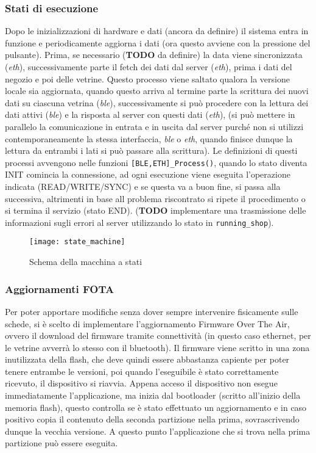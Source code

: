 \subsubsection{Stati di esecuzione}


Dopo le inizializzazioni di hardware e dati (ancora da definire) il sistema entra in funzione e periodicamente aggiorna i dati (ora questo avviene con la pressione del pulsante). Prima, se necessario (\textbf{TODO} da definire) la data viene sincronizzata (\textit{eth}), successivamente parte il fetch dei dati dal server (\textit{eth}), prima i dati del negozio e poi delle vetrine. Questo processo viene saltato qualora la versione locale sia aggiornata, quando questo arriva al termine parte la scrittura dei nuovi dati su ciascuna vetrina (\textit{ble}), successivamente si pu\`o procedere con la lettura dei dati attivi (\textit{ble}) e la risposta al server con questi dati (\textit{eth}), (si pu\`o mettere in parallelo la comunicazione in entrata e in uscita dal server purch\'e non si utilizzi contemporaneamente la stessa interfaccia, \textit{ble} o \textit{eth}, quando finisce dunque la lettura da entrambi i lati si pu\`o passare alla scrittura). Le definizioni di questi processi avvengono nelle funzioni \texttt{[BLE,ETH]\_Process()}, quando lo stato diventa INIT comincia la connessione, ad ogni esecuzione viene eseguita l'operazione indicata (READ/WRITE/SYNC) e se questa va a buon fine, si passa alla successiva, altrimenti in base all problema riscontrato si ripete il procedimento o si termina il servizio (stato END). (\textbf{TODO} implementare una trasmissione delle informazioni sugli errori al server utilizzando lo stato in \texttt{running\_shop}). 

\begin{figure}[h!]
	\texttt{[image: state\_machine]}
  \caption{Schema della macchina a stati}
\end{figure}

\subsubsection{Aggiornamenti FOTA}

Per poter apportare modifiche senza dover sempre intervenire fisicamente sulle schede, si \`e scelto di implementare l'aggiornamento Firmware Over The Air, ovvero il download del firmware tramite connettivit\`a (in questo caso ethernet, per le vetrine avverr\`a lo stesso con il bluetooth). Il firmware viene scritto in una zona inutilizzata della flash, che deve quindi essere abbastanza capiente per poter tenere entrambe le versioni, poi quando l'eseguibile \`e stato correttamente ricevuto, il dispositivo si riavvia. Appena acceso il dispositivo non esegue immediatamente l'applicazione, ma inizia dal bootloader (scritto all'inizio della memoria flash), questo controlla se \`e stato effettuato un aggiornamento e in caso positivo copia il contenuto della seconda partizione nella prima, sovrascrivendo dunque la vecchia versione. A questo punto l'applicazione che si trova nella prima partizione pu\`o essere eseguita.

